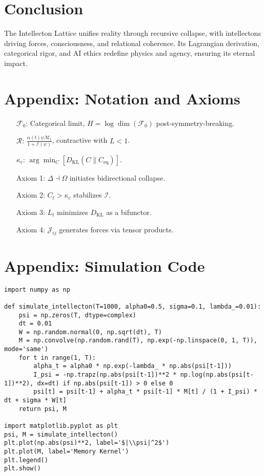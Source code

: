 \documentclass[11pt]{article}
\newcommand{\field}[1]{\mathcal{#1}}
\newcommand{\intellecton}{\mathcal{I}}
\newcommand{\dkl}{D_{\text{KL}}}
\begin{document}
\section{Conclusion}
\label{sec:conclusion}
The Intellecton Lattice unifies reality through recursive collapse, with intellectons driving forces, consciousness, and relational coherence. Its Lagrangian derivation, categorical rigor, and AI ethics redefine physics and agency, ensuring its eternal impact.

\section*{Appendix: Notation and Axioms}
\begin{itemize}
    \item[$\field{F}_0$:] Categorical limit, $H = \log \dim(\field{F}_0)$ post-symmetry-breaking.
    \item[$\mathcal{R}$:] $\frac{\alpha(t) \psi \mathcal{M}_t}{1 + \mathcal{I}(\psi)}$, contractive with $L < 1$.
    \item[$\kappa_c$:] $\arg \min_C [D_{\text{KL}}(C \| C_{\text{eq}})]$.
    \item[Axiom 1:] $\Delta \dashv \Omega$ initiates bidirectional collapse.
    \item[Axiom 2:] $C_t > \kappa_c$ stabilizes $\intellecton$.
    \item[Axiom 3:] $L_t$ minimizes $\dkl$ as a bifunctor.
    \item[Axiom 4:] $\mathcal{J}_{ij}$ generates forces via tensor products.
\end{itemize}

\section*{Appendix: Simulation Code}
\begin{lstlisting}
import numpy as np

def simulate_intellecton(T=1000, alpha0=0.5, sigma=0.1, lambda_=0.01):
    psi = np.zeros(T, dtype=complex)
    dt = 0.01
    W = np.random.normal(0, np.sqrt(dt), T)
    M = np.convolve(np.random.rand(T), np.exp(-np.linspace(0, 1, T)), mode='same')
    for t in range(1, T):
        alpha_t = alpha0 * np.exp(-lambda_ * np.abs(psi[t-1]))
        I_psi = -np.trapz(np.abs(psi[t-1])**2 * np.log(np.abs(psi[t-1])**2), dx=dt) if np.abs(psi[t-1]) > 0 else 0
        psi[t] = psi[t-1] + alpha_t * psi[t-1] * M[t] / (1 + I_psi) * dt + sigma * W[t]
    return psi, M

import matplotlib.pyplot as plt
psi, M = simulate_intellecton()
plt.plot(np.abs(psi)**2, label='$|\\psi|^2$')
plt.plot(M, label='Memory Kernel')
plt.legend()
plt.show()
\end{lstlisting}



\end{document}
